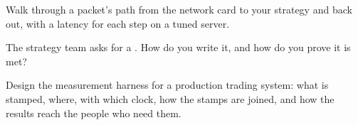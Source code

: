 \begin{interviewq}\label{iq:ll:build-tick-to-trade-measured:4}
Walk through a packet's path from the network card to your strategy and back out, with a latency for each step on a tuned
server.
\end{interviewq}

\begin{interviewq}\label{iq:ll:build-tick-to-trade-measured:5}
The strategy team asks for a . How do you write it, and how do you prove it is met?
\end{interviewq}

\begin{interviewq}\label{iq:ll:build-tick-to-trade-measured:6}
Design the measurement harness for a production trading system: what is stamped, where, with which clock, how the stamps are
joined, and how the results reach the people who need them.
\end{interviewq}
